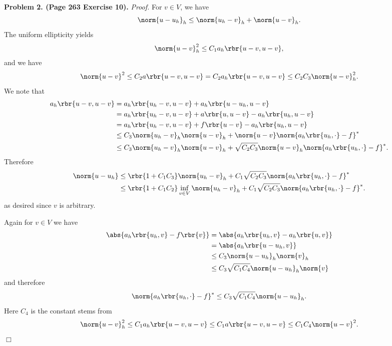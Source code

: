 \documentclass[english, nochinese]{pnote}
\begin{document}
\textbf{Problem 2. (Page 263 Exercise 10).} \textit{Proof.} For $ v \in V $, we have\begin{equation}
\norm{ u - u_h }_h \le \norm{ u_h - v }_h + \norm{ u - v }_h.
\end{equation}
The uniform ellipticity yields
\begin{equation}
\norm{ u - v }_h^2 \le C_1 a_h \rbr{ u - v, u - v },
\end{equation}
and we have
\begin{equation}
\norm{ u - v }^2 \le C_2 a \rbr{ u - v, u - v } = C_2 a_h \rbr{ u - v, u - v } \le C_2 C_3 \norm{ u - v }_h^2.
\end{equation}
We note that
\begin{equation}
\begin{split}
a_h \rbr{ u - v, u - v } &= a_h \rbr{ u_h - v, u - v } + a_h \rbr{ u - u_h, u - v } \\
&= a_h \rbr{ u_h - v, u - v } + a \rbr{ u, u- v } - a_h \rbr{ u_h, u - v } \\
&= a_h \rbr{ u_h - v, u - v } + f \rbr{ u - v } - a_h \rbr{ u_h, u - v } \\
&\le C_3 \norm{ u_h - v }_h \norm{ u - v }_h + \norm{ u - v } \norm{ a_h \rbr{ u_h, \cdot } - f }^{\ast} \\
&\le C_3 \norm{ u_h - v }_h \norm{ u - v }_h + \sqrt{ C_2 C_3 } \norm{ u - v }_h \norm{ a_h \rbr{ u_h, \cdot } - f }^{\ast}.
\end{split}
\end{equation}
Therefore
\begin{equation}
\begin{split}
\norm{ u - u_h } &\le \rbr{ 1 + C_1 C_3 } \norm{ u_h - v }_h + C_1 \sqrt{ C_2 C_3 } \norm{ a_h \rbr{ u_h, \cdot } - f }^{\ast} \\
&\le \rbr{ 1 + C_1 C_2 } \inf_{ v \in V } \norm{ u_h - v }_h + C_1 \sqrt{ C_2 C_3 } \norm{ a_h \rbr{ u_h, \cdot } - f }^{\ast}.
\end{split}
\end{equation}
as desired since $v$ is arbitrary.

Again for $ v \in V $ we have
\begin{equation}
\begin{split}
\abs{ a_h \rbr{ u_h, v } - f \rbr{v} } &= \abs{ a_h \rbr{ u_h, v } - a_h \rbr{ u, v } } \\
&= \abs{ a_h \rbr{ u - u_h, v } } \\
&\le C_3 \norm{ u - u_h }_h \norm{v}_h \\
&\le C_3 \sqrt{ C_1 C_4 } \norm{ u - u_h }_h \norm{v}
\end{split}
\end{equation}
and therefore
\begin{equation}
\norm{ a_h \rbr{ u_h, \cdot } - f }^{\ast} \le C_3 \sqrt{ C_1 C_4 } \norm{ u - u_h }_h.
\end{equation}
Here $C_4$ is the constant stems from
\begin{equation}
\norm{ u - v }_h^2 \le C_1 a_h \rbr{ u - v, u - v } \le C_1 a \rbr{ u - v, u - v } \le C_1 C_4 \norm{ u - v }^2.
\end{equation}
\hfill$\Box$
\end{document}
